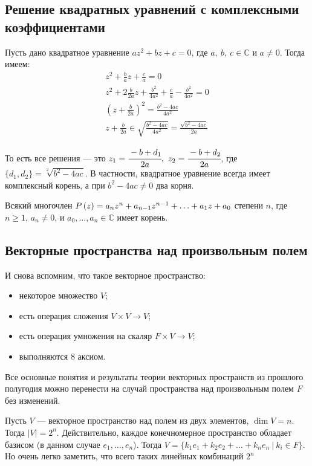\subsection{Решение квадратных уравнений с комплексными коэффициентами}

Пусть дано квадратное уравнение $az^2+bz+c=0$, где $a,\ b,\ c\in\mathbb{C}$ и 	$ a \neq 0$. Тогда имеем:
\begin{gather*}
    z^2+\frac{b}{a}z+\frac{c}{a} = 0\\
    z^2+2\frac{b}{2a}z+\frac{b^2}{4a^2}+\frac{c}{a}-\frac{b^2}{4a^2} = 0\\
    \left(z+\frac{b}{2a}\right)^2=\frac{b^2-4ac}{4a^2}\\
    z+\frac{b}{2a} \in \sqrt{\frac{b^2-4ac}{4a^2}}=\frac{\sqrt{b^2-4ac}}{2a}
\end{gather*}

То есть все решения --- это $z_1 = \cfrac{-b+d_1}{2a},\ z_2 = \cfrac{-b+d_2}{2a}$, где $\{d_1,d_2\} = \sqrt[2]{b^2-4ac}$. В частности, квадратное уравнение всегда имеет комплексный корень, а при $b^2-4ac\neq0$ два корня.

\begin{Theorem}
Всякий многочлен $P\left(z\right) = a_nz^n + a_{n-1}z^{n-1} + \ldots \hm{+} a_1z + a_0$ степени $n$, где $n \geqslant 1$, $a_n \neq 0$, и $a_0,\ldots,a_n \in \mathbb{C}$ имеет корень.
\end{Theorem}

\subsection{Векторные пространства над произвольным полем}

И снова вспомним, что такое векторное пространство:

\begin{itemize}
    \item некоторое множество $V$;
    \item есть операция сложения $V\times V\rightarrow V$;
    \item есть операция умножения на скаляр $F\times V\rightarrow V$;
    \item выполняются 8 аксиом.
\end{itemize}

Все основные понятия и результаты теории векторных пространств из прошлого полугодия можно перенести на случай пространства над произвольным полем $F$ без изменений.

\begin{Examples}
Пусть $V$ --- векторное пространство над полем из двух элементов, $\dim V = n$. Тогда $|V| = 2^n$. Действительно, каждое конечномерное пространство обладает базисом (в данном случае $e_1,\ldots,e_n$). Тогда $V = \{k_1e_1+k_2e_2+\ldots+k_ne_n\ |\ k_i\in F\}$. Но очень легко заметить, что всего таких линейных комбинаций $2^n$
\end{Examples}
